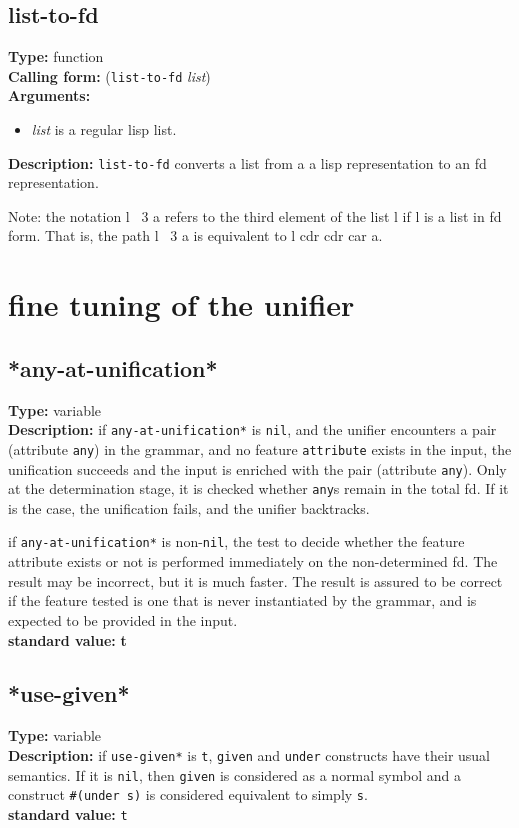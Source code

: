 \documentclass[10pt,a4paper]{report}
\begin{document}
\subsection{list-to-fd}
{\bf Type:} function
\\{\bf Calling form:} ({\tt list-to-fd} {\em list})
\\{\bf Arguments:}
\begin{itemize}
\item {\em list} is a regular lisp list.
\end{itemize}
{\bf Description:} {\tt list-to-fd} converts a list from a
a lisp representation to an fd representation.

Note: the notation {l ~3 a} refers to the third element of the list l if l
is a list in fd form.  That is, the path {l ~3 a} is equivalent to 
{l cdr cdr car a}.


\section{fine tuning of the unifier}

\subsection{*any-at-unification*}
{\bf Type:} variable
\\{\bf Description:} if {\tt *any-at-unification*} is {\tt nil}, and the
unifier encounters a pair (attribute {\tt any}) in the grammar, and
no feature {\tt attribute} exists in the input, the unification
succeeds and the input is enriched with the pair (attribute
{\tt any}). Only at the determination stage, it is checked whether
{\tt any}s remain in the total fd. If it is the case, the
unification fails, and the unifier backtracks. 

if {\tt *any-at-unification*} is non-{\tt nil}, the test to decide
whether the feature attribute exists or not is performed
immediately on the non-determined fd. The result may be
incorrect, but it is much faster. The result is assured to be
correct if the feature tested is one that is never instantiated
by the grammar, and is expected to be provided in the input.
  
\\{\bf standard value:} {\bf t}

\subsection{*use-given*}
{\bf Type:} variable
\\{\bf Description:} if {\tt *use-given*} is {\tt t}, {\tt given} and {\tt under}
constructs have their usual semantics.  If it is {\tt nil}, then {\tt given} is
considered as a normal symbol and a construct {\tt \#(under s)} is considered
equivalent to simply {\tt s}.
\\{\bf standard value:} {\tt t}
\end{document}
